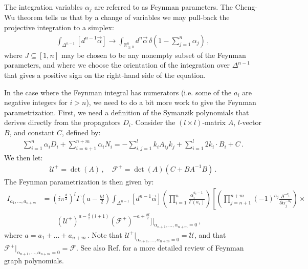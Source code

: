 \documentclass{article}
\begin{document}
The integration variables $\alpha_j$ are referred to as Feynman parameters. The Cheng-Wu theorem \cite{chengwu} tells us that by a change of variables we may pull-back the projective integration to a simplex:
\begin{align}
    \label{eq:projtosimplex}
    \int_{\Delta^{n-1}}\left[d^{n-1} \vec{\alpha}\right] \rightarrow \int_{\mathbb{R}_{\geq 0}^{n}} d^{n} \vec{\alpha}\, \delta\left(1-\sum_{j = 1}^n \alpha_{j}\right)\,,
\end{align}
where $J\subseteq [1,n]$ may be chosen to be any nonempty subset of the Feynman parameters, and where we choose the orientation of the integration over $\Delta^{n-1}$ that gives a positive sign on the right-hand side of the equation.

In the case where the Feynman integral has numerators (i.e. some of the $a_i$ are negative integers for $i > n$), we need to do a bit more work to give the Feynman parametrization. First, we need a definition of the Symanzik polynomials that derives directly from the propagators $D_i$. Consider the $(l\times l)$-matrix $A$, $l$-vector $B$, and constant $C$, defined by:
\begin{align}
    \sum_{i=1}^{n} \alpha_{i} D_i +    \sum_{i=n+1}^{n+m} \alpha_{i} N_i  =-\sum_{i,j=1}^{l} k_{i} A_{ij} k_{j}+\sum_{i=1}^{l} 2 k_{i} \cdot B_{i}+C\,.
\end{align}
We then let:
\begin{align}
    \mathcal{U}^+=\det(A)\,, \quad \mathcal{F}^+=\det(A)\left(C+B A^{-1} B\right)\,.
\end{align}
The Feynman parametrization is then given by:
\begin{align}
    I_{a_1, \ldots, a_{n+m}}&=\left(i \pi^{\frac{d}{2}}\right)^{l}\Gamma\left(a-\frac{l d}{2}\right)\int_{\Delta^{n-1}} [d^{n-1} \vec{\alpha}]   \left(\prod_{i=1}^{n} \frac{\alpha_{i}^{a_{i}-1}}{\Gamma(a_i)}\right) \left[\left(\prod_{j={n+1}}^{n+m}(-1)^{a_j}\frac{\partial^{-a_i}}{\partial \alpha_j^{-a_i}}\right)\times\right.\nonumber\\
    &\quad\quad\left(\mathcal{U}^+\right)^{a-\frac{d}{2}(l+1)} \left(\mathcal{F}^+\right)^{-a+\frac{l d}{2}}\bigg]\bigg|_{\alpha_{n+1},\ldots,\alpha_{n+m} = 0}\,,
\end{align}
where $a = a_1 + \ldots + a_{n+m}$\,. Note that $\mathcal{U}^+|_{\alpha_{n+1},\ldots,\alpha_{n+m} = 0} = \mathcal{U}$, and that $\mathcal{F}^+|_{\alpha_{n+1},\ldots,\alpha_{n+m} = 0} = \mathcal{F}$. See also Ref. \cite{Bogner:2010kv} for a more detailed review of Feynman graph polynomials.
\end{document}
